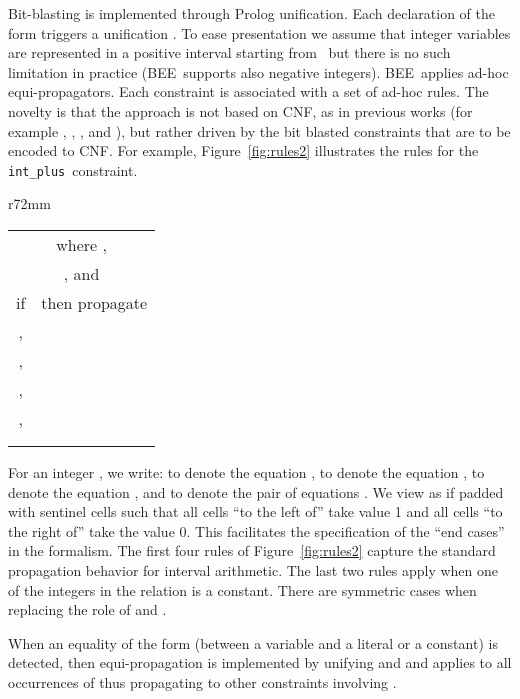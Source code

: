 \documentclass[runningheads,a4paper]{llncs}
\newcommand{\plus}{\texttt{int\_plus}}
\newcommand{\bee}{\textsf{BEE}}
\begin{document}
Bit-blasting is implemented through Prolog unification. Each
declaration of the form  triggers a
unification . To ease
presentation we assume that integer variables are represented in a
positive interval starting from~ but there is no such limitation in
practice (\bee\ supports also negative integers).
\bee\ applies ad-hoc equi-propagators.  Each constraint is associated
with a set of ad-hoc rules.  The novelty is that the approach is not
based on CNF, as in previous works (for example
\cite{chu-min2003}, \cite{sateliteEenB05}, 
\cite{HeuleJarvisaloBiere2011}, and \cite{Manthey2012}),
but rather driven by the bit
blasted constraints that are to be encoded to CNF.
For example, Figure~\ref{fig:rules2} illustrates the rules for the
\plus\ constraint.
\begin{wrapfigure}[12]{r}{72mm}\small
\vspace{-5mm}
\begin{tabular}{|c|c|}
\hline
  \multicolumn{2}{|c|}{\small  where ,}\\
  \multicolumn{2}{|c|}{\small , and
                                }\\
\hline
  {if } & {then propagate} \\
\hline
\hline
,  & \\
\hline
,  & \\
\hline
,  &  \\
\hline
,  &  \\
\hline
 &  \\
\hline
 &   \\
\hline 
\end{tabular}
\caption{Ad-hoc rules for  }
\label{fig:rules2}
\end{wrapfigure}
For an integer , we
write:  to denote the equation ,  to denote the
equation ,  to denote the equation , and
 to denote the pair of equations .
We view  as if padded with sentinel cells
such that all cells ``to the left of''  take value 1 and all
cells ``to the right of''  take the value 0. This facilitates the
specification of the ``end cases'' in the formalism.
The first four rules of Figure~\ref{fig:rules2} capture the
standard propagation behavior for interval arithmetic. The last two
rules apply when one of the integers in the relation is a
constant. There are symmetric cases when replacing the role of  and
.

When an equality of the form  (between a variable and a literal
or a constant) is detected, then equi-propagation is implemented by
unifying  and  and applies to all occurrences of  thus
propagating to other constraints involving .
\end{document}
